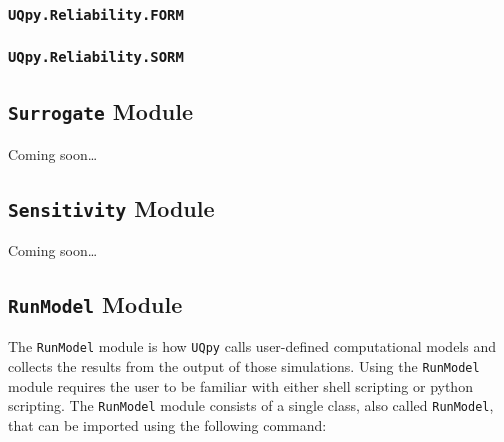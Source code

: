 \documentclass[./UsersGuide.tex]{subfiles}
\begin{document}

\subsubsection{\texttt{UQpy.Reliability.FORM}}


\subsubsection{\texttt{UQpy.Reliability.SORM}}


\subsection{\texttt{Surrogate} Module}

Coming soon\dots


\subsection{\texttt{Sensitivity} Module}

Coming soon\dots



\subsection{\texttt{RunModel} Module}

The \texttt{RunModel} module is how \texttt{UQpy} calls user-defined computational models and collects the results from the output of those simulations. Using the \texttt{RunModel} module requires the user to be familiar with either shell scripting or python scripting.  The \texttt{RunModel} module consists of a single class, also called \texttt{RunModel}, that can be imported using the following command:
\end{document}
